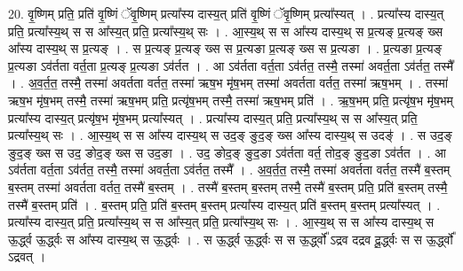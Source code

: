 \documentclass[17pt]{extarticle}
\begin{document}
20. वृ॒ष्णिम् प्रति॒ प्रति॑ वृ॒ष्णिं ॅवृ॒ष्णिम् प्रत्या᳚स्य दास्य॒त् प्रति॑ वृ॒ष्णिं ॅवृ॒ष्णिम् प्रत्या᳚स्यत् । . प्रत्या᳚स्य दास्य॒त् प्रति॒ प्रत्या᳚स्य॒थ् स स आ᳚स्य॒त् प्रति॒ प्रत्या᳚स्य॒थ् सः । . आ॒स्य॒थ् स स आ᳚स्य दास्य॒थ् स प्र॒त्यङ् प्र॒त्यङ् ख्स आ᳚स्य दास्य॒थ् स प्र॒त्यङ् । . स प्र॒त्यङ् प्र॒त्यङ् ख्स स प्र॒त्यङा प्र॒त्यङ् ख्स स प्र॒त्यङा । . प्र॒त्यङा प्र॒त्यङ् प्र॒त्यङा ऽव॑र्तता वर्त॒ता प्र॒त्यङ् प्र॒त्यङा ऽव॑र्तत । . आ ऽव॑र्तता वर्त॒ता ऽव॑र्तत॒ तस्मै॒ तस्मा॑ अवर्त॒ता ऽव॑र्तत॒ तस्मै᳚ । . अ॒व॒र्त॒त॒ तस्मै॒ तस्मा॑ अवर्तता वर्तत॒ तस्मा॑ ऋष॒भ मृ॑ष॒भम् तस्मा॑ अवर्तता वर्तत॒ तस्मा॑ ऋष॒भम् । . तस्मा॑ ऋष॒भ मृ॑ष॒भम् तस्मै॒ तस्मा॑ ऋष॒भम् प्रति॒ प्रत्यृ॑ष॒भम् तस्मै॒ तस्मा॑ ऋष॒भम् प्रति॑ । . ऋ॒ष॒भम् प्रति॒ प्रत्यृ॑ष॒भ मृ॑ष॒भम् प्रत्या᳚स्य दास्य॒त् प्रत्यृ॑ष॒भ मृ॑ष॒भम् प्रत्या᳚स्यत् । . प्रत्या᳚स्य दास्य॒त् प्रति॒ प्रत्या᳚स्य॒थ् स स आ᳚स्य॒त् प्रति॒ प्रत्या᳚स्य॒थ् सः । . आ॒स्य॒थ् स स आ᳚स्य दास्य॒थ् स उद॒ङ् ङुद॒ङ् ख्स आ᳚स्य दास्य॒थ् स उदङ्॑ । . स उद॒ङ् ङुद॒ङ् ख्स स उद॒ ङोद॒ङ् ख्स स उद॒ङा । . उद॒ ङोद॒ङ् ङुद॒ङा ऽव॑र्तता वर्त॒ तोद॒ङ् ङुद॒ङा ऽव॑र्तत । . आ ऽव॑र्तता वर्त॒ता ऽव॑र्तत॒ तस्मै॒ तस्मा॑ अवर्त॒ता ऽव॑र्तत॒ तस्मै᳚ । . अ॒व॒र्त॒त॒ तस्मै॒ तस्मा॑ अवर्तता वर्तत॒ तस्मै॑ ब॒स्तम् ब॒स्तम् तस्मा॑ अवर्तता वर्तत॒ तस्मै॑ ब॒स्तम् । . तस्मै॑ ब॒स्तम् ब॒स्तम् तस्मै॒ तस्मै॑ ब॒स्तम् प्रति॒ प्रति॑ ब॒स्तम् तस्मै॒ तस्मै॑ ब॒स्तम् प्रति॑ । . ब॒स्तम् प्रति॒ प्रति॑ ब॒स्तम् ब॒स्तम् प्रत्या᳚स्य दास्य॒त् प्रति॑ ब॒स्तम् ब॒स्तम् प्रत्या᳚स्यत् । . प्रत्या᳚स्य दास्य॒त् प्रति॒ प्रत्या᳚स्य॒थ् स स आ᳚स्य॒त् प्रति॒ प्रत्या᳚स्य॒थ् सः । . आ॒स्य॒थ् स स आ᳚स्य दास्य॒थ् स ऊ॒र्द्ध्व ऊ॒र्द्ध्वः स आ᳚स्य दास्य॒थ् स ऊ॒र्द्ध्वः । . स ऊ॒र्द्ध्व ऊ॒र्द्ध्वः स स ऊ॒र्द्ध्वो᳚ ऽद्रव दद्रव दू॒र्द्ध्वः स स ऊ॒र्द्ध्वो᳚ ऽद्रवत् । \newline
\end{document}

